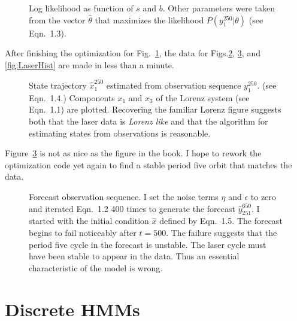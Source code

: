 \documentclass[prelim,showlabels]{book}
\newcommand{\ts}[3]{#1_{#2}^{#3}}                    %
\begin{document}
\begin{figure}[htbp]
  \caption{Log likelihood as function of $s$ and $b$.  Other parameters were
    taken from the vector $\hat \theta$ that maximizes the likelihood
    $P(\ts{y}{1}{250}|\theta)$ (see Eqn.~1.3).}
  \label{fig:LaserLogLike}
\end{figure}

After finishing the optimization for Fig.~\ref{fig:LaserLogLike}, the
data for Figs.\ref{fig:LaserStates}, \ref{fig:LaserForecast}, and
\ref{fig:LaserHist} are made in less than a minute.
\begin{figure}[htbp]
  \caption[State trajectory $\ts{\hat
    x}{1}{250}$.]%
  {State trajectory $\ts{\hat x}{1}{250}$ estimated from observation
    sequence $\ts{y}{1}{250}$. (see Eqn.~1.4.)
    Components $x_1$ and $x_3$ of the Lorenz system (see
    Eqn.~1.1) are plotted.  Recovering the familiar
    Lorenz figure suggests both that the laser data is \emph{Lorenz
      like} and that the algorithm for estimating states from
    observations is reasonable.}
  \label{fig:LaserStates}
\end{figure}

Figure~\ref{fig:LaserForecast} is not as nice as the figure in the book.
I hope to rework the optimization code yet again to find a stable
period five orbit that matches the data.
\begin{figure}[htbp]
  \caption[Forecast observation sequence.]%
  {Forecast observation sequence.  I set the noise terms $\eta$ and
    $\epsilon$ to zero and iterated Eqn.~1.2 400 times to
    generate the forecast $\ts{\hat y}{251}{650}$.  I started with
    the initial condition $\hat x$ defined by Eqn.~1.5.
    The forecast begins to fail noticeably after $t=500$.  The failure
    suggests that the period five cycle in the forecast is unstable.
    The laser cycle must have been stable to appear in the data.  Thus
    an essential characteristic of the model is wrong.}
  \label{fig:LaserForecast}
\end{figure}

\addtocounter{section}{1}
\section{Discrete HMMs}
\label{sec:intro_hmm}
%
\end{document}
